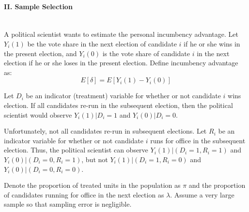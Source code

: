 \documentclass{article}
\begin{document}
\paragraph{\Large II. Sample Selection \\ \\}
\vspace{1em}

\noindent A political scientist wants to estimate the personal incumbency
advantage. Let $Y_i(1)$ be the vote share in the next election of
candidate $i$ if he or she wins in the present election, and $Y_i(0)$
is the vote share of candidate $i$ in the next election if he or she
loses in the present election.  Define incumbency advantage as:
$$E[\delta] = E[Y_i(1) - Y_i(0)]$$

Let $D_i$ be an indicator (treatment) variable for whether or not
candidate $i$ wins election. If all candidates re-run in the subsequent
election, then the political scientist would observe $Y_i(1)|D_i = 1$ and
$Y_i(0)|D_i = 0$.

Unfortunately, not all candidates re-run in subsequent elections. Let
$R_i$ be an indicator variable for whether or not candidate $i$ runs for
office in the subsequent election. Thus, the political scientist can
observe $Y_i(1)|(D_i = 1, R_i = 1)$ and $Y_i(0)|(D_i = 0, R_i = 1)$, but not
$Y_i(1)|(D_i = 1, R_i = 0)$ and $Y_i(0)|(D_i = 0, R_i = 0)$.

Denote the proportion of treated units in the population as $\pi$ and the
proportion of candidates running for office in the next election as
$\lambda$. Assume a very large sample so that sampling error is negligible.
\end{document}
